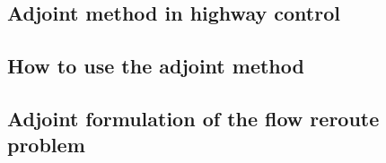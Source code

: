 
\subsection{Adjoint method in highway control}

\subsection{How to use the adjoint method}

\subsection{Adjoint formulation of the flow reroute problem}